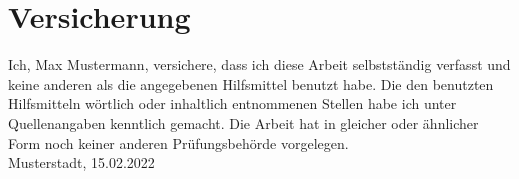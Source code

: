 \documentclass[
    12pt,
    a4paper
]{article}
\begin{document}
\printbibliography[
    title=Literaturverzeichnis,
    heading=bibintoc
]

\clearpage


\section*{Versicherung}
Ich, Max Mustermann, versichere, dass ich diese Arbeit selbstständig verfasst und keine anderen als die angegebenen Hilfsmittel benutzt habe.
Die den benutzten Hilfsmitteln wörtlich oder inhaltlich entnommenen Stellen habe ich unter Quellenangaben kenntlich gemacht.
Die Arbeit hat in gleicher oder ähnlicher Form noch keiner anderen Prüfungsbehörde vorgelegen.\\[1cm]

\noindent
Musterstadt, 15.02.2022
\end{document}
